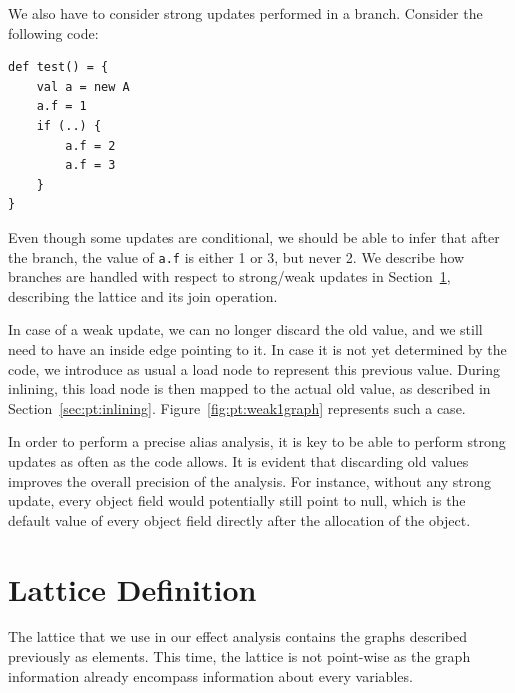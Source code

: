 We also have to consider strong updates performed in a branch. Consider the
following code:

\begin{lstlisting}
def test() = {
    val a = new A
    a.f = 1
    if (..) {
        a.f = 2
        a.f = 3
    }
}
\end{lstlisting}

Even though some updates are conditional, we should be able to infer that
after the branch, the value of \verb/a.f/ is either 1 or 3, but never 2. We
describe how branches are handled with respect to strong/weak updates in
Section~\ref{sec:pt:lattice}, describing the lattice and its join operation.

In case of a weak update, we can no longer discard the old value, and we
still need to have an inside edge pointing to it. In case it is not yet
determined by the code, we introduce as usual a load node to represent this
previous value. During inlining, this load node is then mapped to the actual
old value, as described in Section~\ref{sec:pt:inlining}.
Figure~\ref{fig:pt:weak1graph} represents such a case.

In order to perform a precise alias analysis, it is key to be able to perform
strong updates as often as the code allows. It is evident that discarding old
values improves the overall precision of the analysis. For instance, without
any strong update, every object field would potentially still point to null,
which is the default value of every object field directly after the allocation
of the object.

\section{Lattice Definition}
\label{sec:pt:lattice}
The lattice that we use in our effect analysis contains the graphs described
previously as elements. This time, the lattice is not point-wise as the graph
information already encompass information about every variables.

